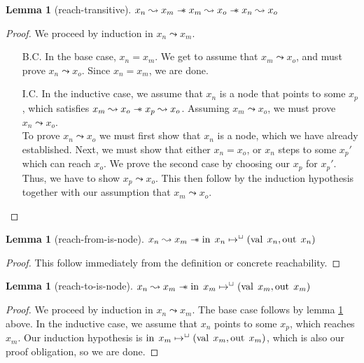 \documentclass[a4paper, 11pt]{report}
\newtheorem{lemma}[theorem]{Lemma}
\newcommand{\nIn}[1]{\operatorname{in} \; #1}
\newcommand{\nVal}[1]{\operatorname{val} \; #1}
\newcommand{\nOut}[1]{\operatorname{out} \; #1}
\newcommand{\isNode}[1]{\nIn{#1} \mapsto^{\persistently} (\nVal{#1}, \nOut{#1})}
\newcommand{\reach}[2]{#1 \leadsto #2}
\begin{document}
\begin{lemma}[reach-transitive]\label{lemma:reach-transitive}
  $\reach{x_n}{x_m} \wand \reach{x_m}{x_o} \wand \reach{x_n}{x_o}$
\end{lemma}
\begin{proof}
  We proceed by induction in $\reach{x_n}{x_m}$.
  \begin{itemize}
    \item[B.C.] In the base case, $x_n = x_m$. We get to assume that $\reach{x_m}{x_o}$, and must prove $\reach{x_n}{x_o}$. Since $x_n = x_m$, we are done.
    \item[I.C.] In the inductive case, we assume that $x_n$ is a node that points to some $x_p$, which satisfies $\reach{x_m}{x_o} \wand \reach{x_p}{x_o}$. Assuming $\reach{x_m}{x_o}$, we must prove $\reach{x_n}{x_o}$.\\
    To prove $\reach{x_n}{x_o}$ we must first show that $x_n$ is a node, which we have already established. Next, we must show that either $x_n = x_o$, or $x_n$ steps to some $x_p'$ which can reach $x_o$. We prove the second case by choosing our $x_p$ for $x_p'$. Thus, we have to show $\reach{x_p}{x_o}$. This then follow by the induction hypothesis together with our assumption that $\reach{x_m}{x_o}$.
  \end{itemize}
\end{proof}

\begin{lemma}[reach-from-is-node]\label{lemma:reach-from-is-node}
  $\reach{x_n}{x_m} \wand \isNode{x_n}$
\end{lemma}
\begin{proof}
  This follow immediately from the definition or concrete reachability.
\end{proof}

\begin{lemma}[reach-to-is-node]\label{lemma:reach-to-is-node}
  $\reach{x_n}{x_m} \wand \isNode{x_m}$
\end{lemma}
\begin{proof}
  We proceed by induction in $\reach{x_n}{x_m}$. The base case follows by lemma \ref{lemma:reach-from-is-node} above. In the inductive case, we assume that $x_n$ points to some $x_p$, which reaches $x_m$. Our induction hypothesis is $\isNode{x_m}$, which is also our proof obligation, so we are done.
\end{proof}
\end{document}
